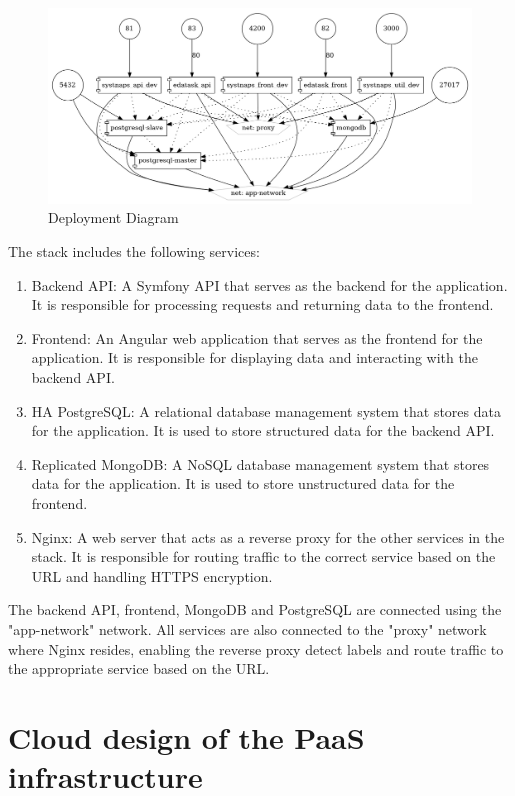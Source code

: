  \begin{figure}[H]\centering
\includegraphics[width=1.0\textwidth,angle=00]{assets/f10.png}
\caption{ Deployment Diagram }
\label{fig:DeploymentDiagram}
\end{figure}

The stack includes the following services: 
\begin{enumerate}
\item Backend API: A Symfony\cite{Symfony} API that serves as the backend for the application. It is responsible for processing requests and returning data to the frontend. 
\item Frontend: An Angular\cite{Angular} web application that serves as the frontend for the application. It is responsible for displaying data and interacting with the backend API. 
\item HA PostgreSQL\cite{PostgreSQL}: A relational database management system that stores data for the application. It is used to store structured data for the backend API. 
\item Replicated MongoDB\cite{MongoDB}: A NoSQL database management system that stores data for the application. It is used to store unstructured data for the frontend. 
\item Nginx\cite{Nginx}: A web server that acts as a reverse proxy for the other services in the stack. It is responsible for routing traffic to the correct service based on the URL and handling HTTPS encryption. 
\end{enumerate}

The backend API, frontend, MongoDB and PostgreSQL are connected using the "app-network" network. All services are also connected to the "proxy" network where Nginx resides, enabling the reverse proxy detect labels and route traffic to the appropriate service based on the URL.
\newpage
\section{Cloud design of the PaaS infrastructure}
